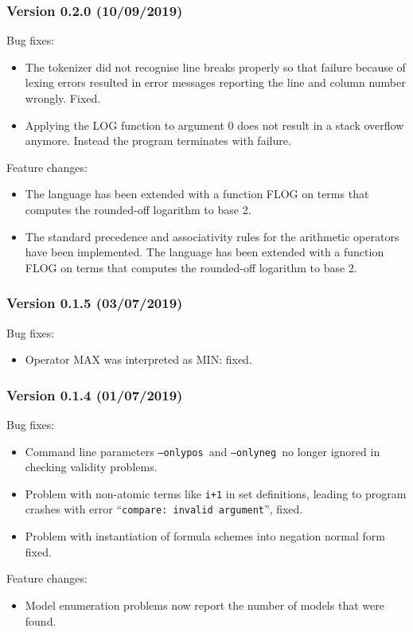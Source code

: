 \documentclass[twoside]{article}
\begin{document}
\subsubsection*{Version 0.2.0 (10/09/2019)}

Bug fixes:
\begin{itemize}
\item The tokenizer did not recognise line breaks properly so that failure because of lexing errors resulted in error messages reporting the line and column number wrongly. Fixed.
\item Applying the LOG function to argument 0 does not result in a stack overflow anymore. Instead the program terminates with failure. 
\end{itemize}
Feature changes:
\begin{itemize}
\item The \DiMo language has been extended with a function FLOG on terms that computes the rounded-off logarithm to base 2.
\item The standard precedence and associativity rules for the arithmetic operators have been implemented. The \DiMo language has been extended with a function FLOG on terms that computes the rounded-off logarithm to base 2.
\end{itemize}


\subsubsection*{Version 0.1.5 (03/07/2019)}

Bug fixes:
\begin{itemize}
\item Operator MAX was interpreted as MIN: fixed.
\end{itemize}


\subsubsection*{Version 0.1.4 (01/07/2019)}

Bug fixes:
\begin{itemize}
\item Command line parameters \texttt{--onlypos} and \texttt{--onlyneg} no longer ignored in checking validity problems.
\item Problem with non-atomic terms like \texttt{i+1} in set definitions, leading to program crashes with error ``\texttt{compare: invalid argument}'', fixed.
\item Problem with instantiation of formula schemes into negation normal form fixed.
\end{itemize}
Feature changes:
\begin{itemize}
\item Model enumeration problems now report the number of models that were found.
\end{itemize}
\end{document}
